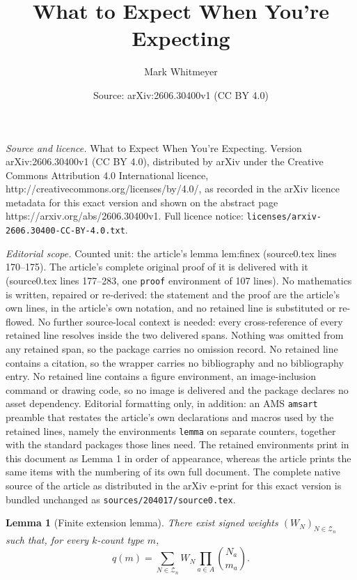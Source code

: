 \documentclass[10pt,a4paper]{amsart}
\title{What to Expect When You're Expecting}
\author{Mark Whitmeyer}
\date{Source: arXiv:2606.30400v1 (CC BY 4.0)}
\newtheorem{lemma}{Lemma}
\begin{document}
\maketitle

\noindent\emph{Source and licence.} What to Expect When You're Expecting. Version arXiv:2606.30400v1 (CC BY 4.0), distributed by arXiv under the Creative Commons Attribution 4.0 International licence, http://creativecommons.org/licenses/by/4.0/, as recorded in the arXiv licence metadata for this exact version and shown on the abstract page https://arxiv.org/abs/2606.30400v1. Full licence notice: \texttt{licenses/arxiv-2606.30400-CC-BY-4.0.txt}.\par\smallskip

\noindent\textit{Editorial scope.} Counted unit: the article's lemma lem:finex (source0.tex lines 170--175). The article's complete original proof of it is delivered with it (source0.tex lines 177--283, one \texttt{proof} environment of 107 lines). No mathematics is written, repaired or re-derived: the statement and the proof are the article's own lines, in the article's own notation, and no retained line is substituted or re-flowed.  No further source-local context is needed: every cross-reference of every retained line resolves inside the two delivered spans.  Nothing was omitted from any retained span, so the package carries no omission record.  No retained line contains a citation, so the wrapper carries no bibliography and no bibliography entry.  No retained line contains a figure environment, an image-inclusion command or drawing code, so no image is delivered and the package declares no asset dependency.  Editorial formatting only, in addition: an AMS \texttt{amsart} preamble that restates the article's own declarations and macros used by the retained lines, namely the environments \texttt{lemma} on separate counters, together with the standard packages those lines need.  The retained environments print in this document as Lemma 1 in order of appearance, whereas the article prints the same items with the numbering of its own full document.  The complete native source of the article as distributed in the arXiv e-print for this exact version is bundled unchanged as \texttt{sources/204017/source0.tex}.
\begin{lemma}[Finite extension lemma]\label{lem:finex}
There exist signed weights \(\left(W_N\right)_{N\in\mathcal Z_n}\) such that, for every \(k\)-count type \(m\),
\[
q\left(m\right)=\sum_{N\in\mathcal Z_n}W_N\prod_{a\in A}\binom{N_a}{m_a}.
\]
\end{lemma}
\end{document}
